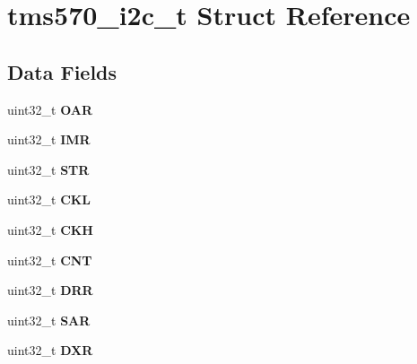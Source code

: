 \hypertarget{structtms570__i2c__t}{}\section{tms570\+\_\+i2c\+\_\+t Struct Reference}
\label{structtms570__i2c__t}
\subsection*{Data Fields}
\begin{DoxyCompactItemize}
\item 
\mbox{\label{structtms570__i2c__t_a196d4abcec96564f926e7d4c11b7392f}} 
uint32\+\_\+t {\bfseries O\+AR}
\item 
\mbox{\label{structtms570__i2c__t_acbf47d0a4b03a5d06df635a6701df6f2}} 
uint32\+\_\+t {\bfseries I\+MR}
\item 
\mbox{\label{structtms570__i2c__t_ab2f3e5b2f51896e2d75ae6f467816acf}} 
uint32\+\_\+t {\bfseries S\+TR}
\item 
\mbox{\label{structtms570__i2c__t_ae3dbaa206a129422acb344ed30b33a7b}} 
uint32\+\_\+t {\bfseries C\+KL}
\item 
\mbox{\label{structtms570__i2c__t_a80a412157f435600abf77e56a58b5d0c}} 
uint32\+\_\+t {\bfseries C\+KH}
\item 
\mbox{\label{structtms570__i2c__t_a8fe9c0a4a483a3a0b172a3c10e0aba91}} 
uint32\+\_\+t {\bfseries C\+NT}
\item 
\mbox{\label{structtms570__i2c__t_afd6e965f93bb9e988054f38a7c465e16}} 
uint32\+\_\+t {\bfseries D\+RR}
\item 
\mbox{\label{structtms570__i2c__t_ab8c7b83054fd95a0e62c8d481d73fba3}} 
uint32\+\_\+t {\bfseries S\+AR}
\item 
\mbox{\label{structtms570__i2c__t_a1ee73f99f0171affe817abc299a6f295}} 
uint32\+\_\+t {\bfseries D\+XR}
\item 
\mbox{\label{structtms570__i2c__t_a8e5a840d98d200c9e1a3eb3fa2db12e7}} 

\end{DoxyCompactItemize}
